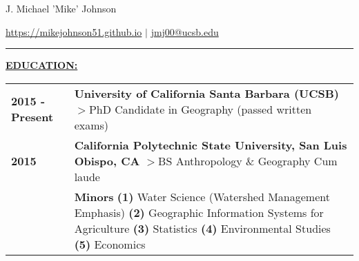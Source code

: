 \documentclass{article}
\newcommand\tab[1][1cm]{\hspace*{#1}} %
\newcommand{\header}[1]{\hspace{-5mm}\textcolor{header_blue}{\underline{\textbf{#1}}\\}} %
\begin{document}



\sffamily
\centerline{{\Huge \textcolor[RGB]{6,60,97}{J. Michael 'Mike' Johnson}}}
\vspace{2mm}
\centerline{\textcolor{header_blue}{\textcolor{gray}{\faHome} \hspace{0.2mm} \url{ https://mikejohnson51.github.io}} $|$ \textcolor{gray}{\faEnvelope} \hspace{0.2mm} \href{mailto:jmj00@ucsb.edu }{jmj00@ucsb.edu}}
\textcolor[RGB]{6,60,97}{\rule{\linewidth}{3pt}}
\vspace{3mm}
\rmfamily

\header{EDUCATION:}
\newline
\hspace*{0mm}
\begin{tabular}{p{2.5cm}p{25cm}}
\textbf{2015 - Present} & \textbf{University of California Santa Barbara (UCSB)} \newline \tab $>$PhD Candidate in Geography (passed written exams) \\
\textbf{2015} & \textbf{California Polytechnic State University, San Luis Obispo, CA} \newline \tab $>$BS Anthropology \& Geography Cum laude \\
\ & \textbf{Minors} \textbf{(1)} Water Science (Watershed Management Emphasis) \textbf{(2)} Geographic Information \newline \tab \tab Systems for Agriculture \textbf{(3)} Statistics \textbf{(4)} Environmental Studies \textbf{(5)} Economics
\end{tabular}
\vspace{5mm}

\end{document}
